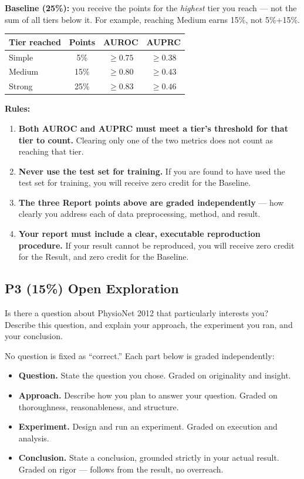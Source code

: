 \documentclass{article}
\begin{document}
\textbf{Baseline (25\%):} you receive the points for the \emph{highest} tier you reach --- not the sum of all tiers below it. For example, reaching Medium earns 15\%, not 5\%+15\%.

\begin{center}
\begin{tabular}{lccc}
\hline
Tier reached & Points & AUROC & AUPRC \\
\hline
Simple & 5\% & $\ge 0.75$ & $\ge 0.38$ \\
Medium & 15\% & $\ge 0.80$ & $\ge 0.43$ \\
Strong & 25\% & $\ge 0.83$ & $\ge 0.46$ \\
\hline
\end{tabular}
\end{center}

\textbf{Rules:}
\begin{enumerate}
    \item \textbf{Both AUROC and AUPRC must meet a tier's threshold for that tier to count.} Clearing only one of the two metrics does not count as reaching that tier.
    \item \textbf{Never use the test set for training.} If you are found to have used the test set for training, you will receive zero credit for the Baseline.
    \item \textbf{The three Report points above are graded independently} --- how clearly you address each of data preprocessing, method, and result.
    \item \textbf{Your report must include a clear, executable reproduction procedure.} If your result cannot be reproduced, you will receive zero credit for the Result, and zero credit for the Baseline.
\end{enumerate}

\subsection*{P3 (15\%) \textbf{Open Exploration}}

Is there a question about PhysioNet 2012 that particularly interests you? Describe this question, and explain your approach, the experiment you ran, and your conclusion.

No question is fixed as ``correct.'' Each part below is graded independently:

\begin{itemize}
    \item[3\%] \textbf{Question.} State the question you chose. Graded on originality and insight.
    \item[3\%] \textbf{Approach.} Describe how you plan to answer your question. Graded on thoroughness, reasonableness, and structure.
    \item[6\%] \textbf{Experiment.} Design and run an experiment. Graded on execution and analysis.
    \item[3\%] \textbf{Conclusion.} State a conclusion, grounded strictly in your actual result. Graded on rigor --- follows from the result, no overreach.
\end{itemize}
\end{document}
